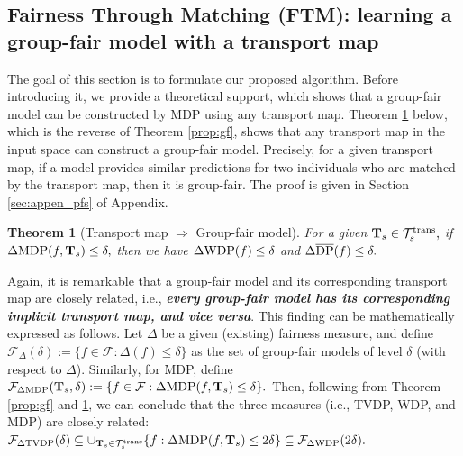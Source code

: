 \documentclass[10pt]{article} %
\newtheorem{theorem}{Theorem}[section]
\begin{document}


\subsection{Fairness Through Matching (FTM): learning a group-fair model with a transport map}\label{sec:improve}

The goal of this section is to formulate our proposed algorithm.
Before introducing it, we provide a theoretical support, which shows that a group-fair model can be constructed by MDP using any transport map.
Theorem \ref{prop:reversefair} below, which is the reverse of Theorem \ref{prop:gf}, shows that any transport map in the input space can construct a group-fair model.
Precisely, for a given transport map, if a model provides similar predictions for two individuals who are matched by the transport map, then it is group-fair.
The proof is given in Section \ref{sec:appen_pfs} of Appendix.
\begin{theorem}[Transport map $\Rightarrow$ Group-fair model]\label{prop:reversefair}
    For a given $\mathbf{T}_{s} \in \mathcal{T}_{s}^{\textup{trans}},$
    if $\Delta \textup{MDP} (f, \mathbf{T}_{s}) \le \delta,$
    then we have $\Delta \textup{WDP} ( f )\le \delta$ and $\Delta \overline{\textup{DP}} ( f ) \le \delta.$
\end{theorem}

Again, it is remarkable that a group-fair model and its corresponding transport map are closely related, i.e., \textbf{\textit{every group-fair model has its corresponding implicit transport map, and vice versa}}.
This finding can be mathematically expressed as follows.
Let $\Delta$ be a given (existing) fairness measure, and define $\mathcal{F}_{\Delta} (\delta) := \{ f \in \mathcal{F} : \Delta(f) \le \delta \}$ as the set of group-fair models of level $\delta$ (with respect to $\Delta$).
Similarly, for MDP, define $\mathcal{F}_{\Delta \textup{MDP}} (\mathbf{T}_{s}, \delta) := \{ f \in \mathcal{F} : \Delta \textup{MDP} (f, \mathbf{T}_{s}) \le \delta \}.$
Then, following from Theorem \ref{prop:gf} and \ref{prop:reversefair}, we can conclude that the three measures (i.e., TVDP, WDP, and MDP) are closely related:
$
\mathcal{F}_{\Delta \textup{TVDP}} (\delta) \subseteq \cup_{\mathbf{T}_{s} \in \mathcal{T}_{s}^{\textup{trans}}} \{ f: \Delta \textup{MDP}(f, \mathbf{T}_{s}) \le 2\delta \} \subseteq \mathcal{F}_{\Delta \textup{WDP}} (2\delta).
$
\end{document}
